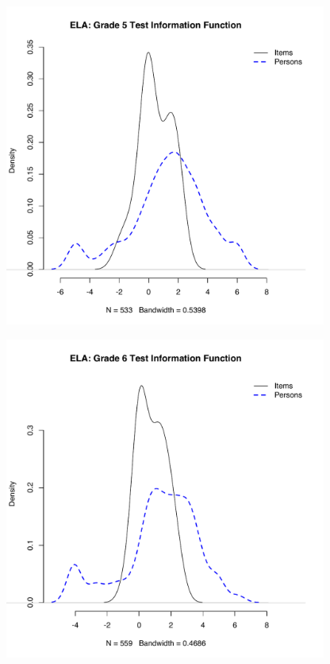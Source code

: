 \documentclass[]{article}
\begin{document}
\begin{figure}
\centering
\includegraphics[height=4.16667in]{ipdens/ela5ipdens.pdf}
\caption{}
\end{figure}

\begin{figure}
\centering
\includegraphics[height=4.16667in]{ipdens/ela6ipdens.pdf}
\caption{}
\end{figure}
\end{document}
